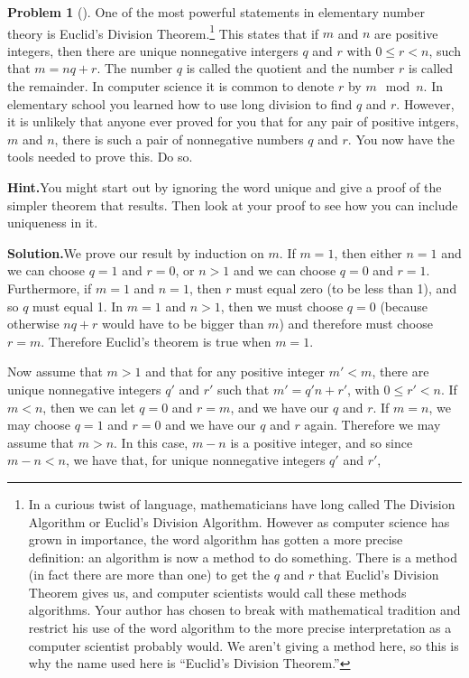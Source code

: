 \documentclass[10pt,]{book}
\theoremstyle{plain}
\theoremstyle{definition}
\newtheorem{activity}[project]{Problem}
\theoremstyle{definition}
\numberwithin{equation}{chapter}
\newcommand{\lt}{<}
\newcommand{\gt}{>}
\begin{document}
\begin{activity}[]\label{euclidsdivthm}
One of the most powerful statements in elementary number theory is Euclid's Division Theorem.\footnote{In a curious twist of language, mathematicians have long called The Division Algorithm or Euclid's Division Algorithm. However as computer science has grown in importance, the word algorithm has gotten a more precise definition: an algorithm is now a method to do something. There is a method (in fact there are more than one) to get the \(q\) and \(r\) that Euclid's Division Theorem gives us, and computer scientists would call these methods algorithms. Your author has chosen to break with mathematical tradition and restrict his use of the word algorithm to the more precise interpretation as a computer scientist probably would. We aren't giving a method here, so this is why the name used here is ``Euclid's Division Theorem.''\label{fn-25}} This states that if \(m\) and \(n\) are positive integers, then there are unique nonnegative intergers \(q\) and \(r\) with \(0 \le r \lt n\), such that \(m = nq + r\). The number \(q\) is called the quotient and the number \(r\) is called the remainder. In computer science it is common to denote \(r\) by \(m \mod n\). In elementary school you learned how to use long division to find \(q\) and \(r\). However, it is unlikely that anyone ever proved for you that for any pair of positive intgers, \(m\) and \(n\), there is such a pair of nonnegative numbers \(q\) and \(r\). You now have the tools needed to prove this. Do so.%
\par\medskip\noindent%
\textbf{Hint.}\quad You might start out by ignoring the word unique and give a proof of the simpler theorem that results. Then look at your proof to see how you can include uniqueness in it.%
\par\medskip\noindent%
\textbf{Solution.}\quad We prove our result by induction on \(m\).  If \(m=1\), then either \(n = 1\) and we can choose \(q = 1\) and \(r = 0\), or \(n \gt 1\) and we can choose \(q = 0\) and \(r = 1\).  Furthermore, if \(m = 1\) and \(n = 1\), then \(r\) must equal zero (to be less than 1), and so \(q\) must equal 1.  In \(m=1\) and \(n \gt 1\), then we must choose \(q = 0\) (because otherwise \(nq+r\) would have to be bigger than \(m\)) and therefore must choose \(r = m\).  Therefore Euclid's theorem is true when \(m = 1\).%
\par
Now assume that \(m \gt 1\) and that for any positive integer \(m' \lt m\), there are unique nonnegative integers \(q'\) and \(r'\) such that \(m' = q'n+r'\), with \(0 \le r' \lt n\).  If \(m \lt n\), then we can let \(q = 0\) and \(r = m\), and we have our \(q\) and \(r\).  If \(m = n\), we may choose \(q = 1\) and \(r = 0\) and we have our \(q\) and \(r\) again.  Therefore we may assume that \(m \gt n\). In this case, \(m-n\) is a positive integer, and so since \(m-n \lt n\), we have that, for unique nonnegative integers \(q'\) and \(r'\),%

\end{activity}
\end{document}
